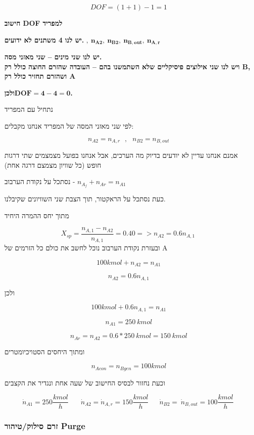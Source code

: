 \documentclass[
  hebrew,
  letterpaper,
  DIV=11,
  numbers=noendperiod]{scrreprt}
\begin{document}
\[DOF = (1 + 1) - 1 = 1\]

\textbf{חישוב DOF למפריד}

\textbf{יש לנו 4 משתנים לא ידועים.}
\(\mathbf{,\ }\mathbf{n}_{\mathbf{A2}}\mathbf{,\ }\mathbf{n}_{\mathbf{B2}}\mathbf{,\ }\mathbf{n}_{\mathbf{B,out}}\mathbf{,\ }\mathbf{n}_{\mathbf{A,r}}\)

\textbf{יש לנו שני מינים -- שני מאזני מסה.\\
ויש לנו שני אילוצים פיסיקליים שלא השתמשנו בהם -- העובדה שהזרם החוצה כולל
רק B, ושהזרם תחזיר כולל רק A}

\textbf{ולכן}\(\mathbf{DOF = 4 - 4 = 0}\)\textbf{.}

נתחיל עם המפריד

לפי שני מאזני המסה של המפריד אנחנו מקבלים:

\[n_{A2} = n_{A,r}\ \ \ ,\ \ \ n_{B2} = n_{B,out}\]

אמנם אנחנו עדיין לא יודעים בדיוק מה הערכים, אבל אנחנו בפועל מצמצמים שתי
דרגות חופש (כל שוויון מצמצם דרגה אחת)

נסתכל על נקודת הערבוב - \(n_{A_{f}} + n_{Ar} = n_{A1}\)

כעת נסתכל על הראקטור, תוך הצבת שני השוויונים שקיבלנו.

מתוך יחס ההמרה היחיד

\[X_{sp} = \frac{n_{A,1} - n_{A2}}{n_{A,1}} = 0.40 = > n_{A2} = 0.6n_{A,1}\ \]
ובעזרת נקודת הערבוב נוכל לחשב את כולם כל הזרמים של A

\[100kmol + n_{A2} = n_{A1}\]

\[n_{A2} = 0.6n_{A,1}\]

ולכן

\[100kmol + 0.6n_{A,1} = n_{A1}\]

\[n_{A1} = 250\ kmol\]

\[n_{Ar} = n_{A2} = 0.6*250\ kmol = 150\ kmol\]

ומתוך היחסים הסטויכיומטרים

\[n_{Acon} = n_{Bgen} = 100kmol\]

וכעת נחזור לבסיס החישוב של שעה אחת ונגדיר את הקצבים

\[{\dot{n}}_{A1} = 250\frac{kmol}{h}\ \ \ \ \ \ \ \ {\dot{n}}_{A2} = {\dot{n}}_{A,r} = 150\frac{kmol}{h}\ \ \ \ \ \ \ {\dot{n}}_{B2} = \ {\dot{n}}_{B,out} = 100\frac{kmol}{h}\ \]

\subsubsection{זרם סילוק/טיהור
Purge}\label{ux5d6ux5e8ux5dd-ux5e1ux5d9ux5dcux5d5ux5e7ux5d8ux5d9ux5d4ux5d5ux5e8-purge}
\end{document}
